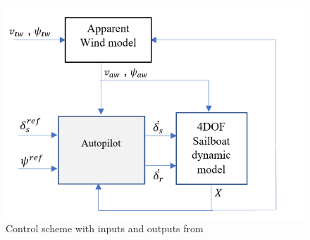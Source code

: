 \documentclass[conference]{IEEEtran}
\begin{document}
\begin{figure}
    \centering
    \includegraphics{documents/proposal/control_scheme.PNG}
    \caption{Control scheme with inputs and outputs from \cite{HelmiAbrougui2019}}
    \label{fig:control_scheme.png}
\end{figure}




\end{document}
